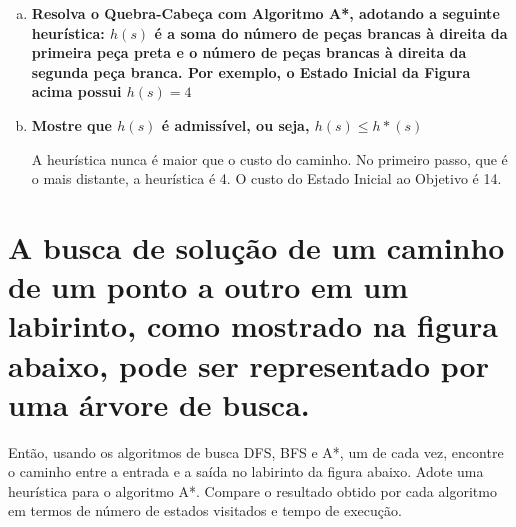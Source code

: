 \documentclass[paper=a4, fontsize=11pt]{scrartcl} %
\begin{document}
    \begin{enumerate}[(a)]
        \pagebreak
        \item \textbf{Resolva o Quebra-Cabeça com Algoritmo A*, adotando a seguinte heurística: $h(s)$ é a soma do número de peças brancas à direita da primeira peça preta e o número de peças brancas à direita da segunda peça branca. Por exemplo, o Estado Inicial da Figura acima possui $h(s) = 4$}
        \par 
        \vspace{0.2cm}

        \item \textbf{Mostre que $h(s)$ é admissível, ou seja, $h(s) \leq h*(s)$}
        \par A heurística nunca é maior que o custo do caminho. No primeiro passo, que é o mais distante, a heurística é 4. O custo do Estado Inicial ao Objetivo é 14.
        \vspace{0.2cm}

    \end{enumerate}

    
    \section{A busca de solução de um caminho de um ponto a outro em um labirinto, como mostrado na figura abaixo, pode ser representado por uma árvore de busca.}
    
    \par Então, usando os algoritmos de busca DFS, BFS e A*, um de cada vez, encontre o caminho entre a entrada e a saída no labirinto da figura abaixo. Adote uma heurística para o algoritmo A*. Compare o resultado obtido por cada algoritmo em termos de número de estados visitados e tempo de execução.
\end{document}
